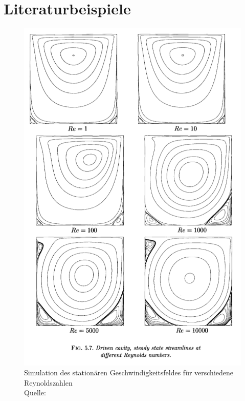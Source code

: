 \section{Literaturbeispiele} %
\label{sec:literaturbeispiele}

	\begin{figure}[H]
		\center
		\includegraphics[scale = 0.5]{screenshots/literatur-re-01.png}
		\caption{Simulation des stationären Geschwindigkeitsfeldes für verschiedene Reynoldszahlen \\ Quelle: \cite{nsfd} }
		\label{fig:literatur re 01}
	\end{figure}


